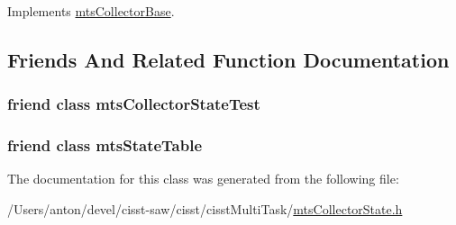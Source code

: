 Implements \hyperlink{classmts_collector_base_a56f67fc120a7088b8d5904a3a785d5dd}{mts\+Collector\+Base}.



\subsection{Friends And Related Function Documentation}
\hypertarget{classmts_collector_state_a9e2828100f64238c027a54e6a38b8307}{}
\subsubsection[{mts\+Collector\+State\+Test}]{\setlength{\rightskip}{0pt plus 5cm}friend class mts\+Collector\+State\+Test\hspace{0.3cm}{\ttfamily [friend]}}\label{classmts_collector_state_a9e2828100f64238c027a54e6a38b8307}
\hypertarget{classmts_collector_state_af4d045a97beae5ceb1642100f69e82c9}{}
\subsubsection[{mts\+State\+Table}]{\setlength{\rightskip}{0pt plus 5cm}friend class {\bf mts\+State\+Table}\hspace{0.3cm}{\ttfamily [friend]}}\label{classmts_collector_state_af4d045a97beae5ceb1642100f69e82c9}


The documentation for this class was generated from the following file\+:\begin{DoxyCompactItemize}
\item 
/\+Users/anton/devel/cisst-\/saw/cisst/cisst\+Multi\+Task/\hyperlink{mts_collector_state_8h}{mts\+Collector\+State.\+h}\end{DoxyCompactItemize}
